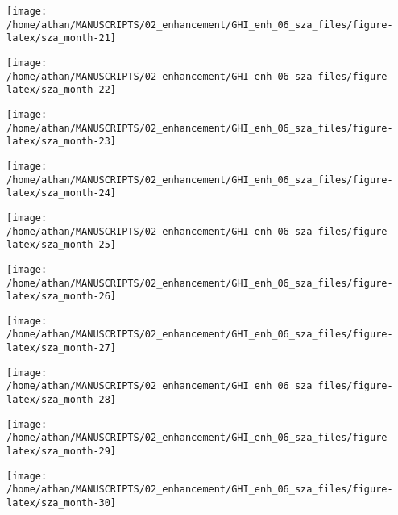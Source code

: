 \documentclass[
  10pt,
  a4paper,oneside]{article}
\begin{document}
\begin{center}\texttt{[image: /home/athan/MANUSCRIPTS/02\_enhancement/GHI\_enh\_06\_sza\_files/figure-latex/sza\_month-21]} \end{center}

\begin{center}\texttt{[image: /home/athan/MANUSCRIPTS/02\_enhancement/GHI\_enh\_06\_sza\_files/figure-latex/sza\_month-22]} \end{center}

\begin{center}\texttt{[image: /home/athan/MANUSCRIPTS/02\_enhancement/GHI\_enh\_06\_sza\_files/figure-latex/sza\_month-23]} \end{center}

\begin{center}\texttt{[image: /home/athan/MANUSCRIPTS/02\_enhancement/GHI\_enh\_06\_sza\_files/figure-latex/sza\_month-24]} \end{center}

\begin{center}\texttt{[image: /home/athan/MANUSCRIPTS/02\_enhancement/GHI\_enh\_06\_sza\_files/figure-latex/sza\_month-25]} \end{center}

\begin{center}\texttt{[image: /home/athan/MANUSCRIPTS/02\_enhancement/GHI\_enh\_06\_sza\_files/figure-latex/sza\_month-26]} \end{center}

\begin{center}\texttt{[image: /home/athan/MANUSCRIPTS/02\_enhancement/GHI\_enh\_06\_sza\_files/figure-latex/sza\_month-27]} \end{center}

\begin{center}\texttt{[image: /home/athan/MANUSCRIPTS/02\_enhancement/GHI\_enh\_06\_sza\_files/figure-latex/sza\_month-28]} \end{center}

\begin{center}\texttt{[image: /home/athan/MANUSCRIPTS/02\_enhancement/GHI\_enh\_06\_sza\_files/figure-latex/sza\_month-29]} \end{center}

\begin{center}\texttt{[image: /home/athan/MANUSCRIPTS/02\_enhancement/GHI\_enh\_06\_sza\_files/figure-latex/sza\_month-30]} \end{center}
\end{document}
